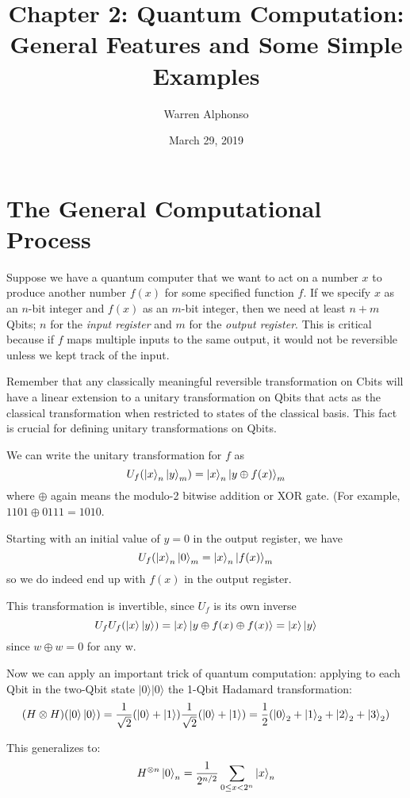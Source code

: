 \documentclass[letterpaper]{article}
\title{Chapter 2: Quantum Computation: General Features and Some Simple Examples}
\author{Warren Alphonso}
\date{March 29, 2019}
\begin{document}
\maketitle

\section{The General Computational Process} 

Suppose we have a quantum computer that we want to act on a number $x$ to produce another number $f(x)$ for some specified function $f$. If we specify $x$ as an $n$-bit integer and $f(x)$ as an $m$-bit integer, then we need at least $n+m$ Qbits; $n$ for the \textsl{input register} and $m$ for the \textsl{output register}. This is critical because if $f$ maps multiple inputs to the same output, it would not be reversible unless we kept track of the input. 

Remember that any classically meaningful reversible transformation on Cbits will have a linear extension to a unitary transformation on Qbits that acts as the classical transformation when restricted to states of the classical basis. This fact is crucial for defining unitary transformations on Qbits.

We can write the unitary transformation for $f$ as
$$ U_{f} (\ket{x}_{n} \ket{y}_{m}) = \ket{x}_{n} \ket{y \oplus f(x)}_{m} $$
where $\oplus$ again means the modulo-2 bitwise addition or XOR gate. (For example, $1101 \oplus 0111 = 1010 $. 

Starting with an initial value of $y = 0$ in the output register, we have 
$$ U_{f}(\ket{x}_{n} \ket{0}_{m} = \ket{x}_{n} \ket{f(x)}_{m} $$
so we do indeed end up with $f(x)$ in the output register. 

This transformation is invertible, since $U_{f}$ is its own inverse 
$$ U_{f}U_{f}(\ket{x} \ket{y}) = \ket{x} \ket{y \oplus f(x) \oplus f(x)} = \ket{x} \ket{y} $$
since $w \oplus w = 0$ for any w.

Now we can apply an important trick of quantum computation: applying to each Qbit in the two-Qbit state $\vert 0 \rangle \vert 0 \rangle$ the 1-Qbit Hadamard transformation: 
$$ (H \otimes H)(\ket{0} \ket{0}) = \frac{1}{\sqrt{2}}(\ket{0} + \ket{1}) \frac{1}{\sqrt{2}}(\ket{0} + \ket{1}) = \frac{1}{2} (\ket{0}_{2} + \ket{1}_{2} + \ket{2}_{2} + \ket{3}_{2})$$

This generalizes to: 
\begin{equation}
 H^{\otimes n} \ket{0}_{n} = \frac{1}{2^{n / 2}} \sum_{0 \leq x < 2^{n}} \ket{x}_{n}
\end{equation}
\end{document}

